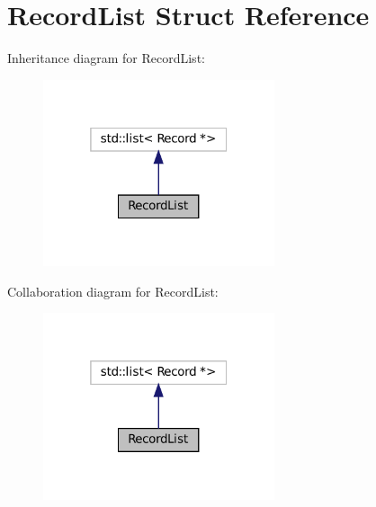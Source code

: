 \hypertarget{structRecordList}{}\section{Record\+List Struct Reference}
\label{structRecordList}


Inheritance diagram for Record\+List\+:
\nopagebreak
\begin{figure}[H]
\begin{center}
\leavevmode
\includegraphics[width=193pt]{structRecordList__inherit__graph}
\end{center}
\end{figure}


Collaboration diagram for Record\+List\+:
\nopagebreak
\begin{figure}[H]
\begin{center}
\leavevmode
\includegraphics[width=193pt]{structRecordList__coll__graph}
\end{center}
\end{figure}
